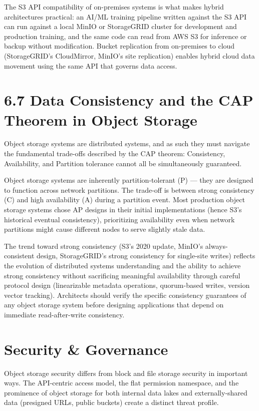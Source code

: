The S3 API compatibility of on-premises systems is what makes hybrid architectures practical: an AI/ML training pipeline written against the S3 API can run against a local MinIO or StorageGRID cluster for development and production training, and the same code can read from AWS S3 for inference or backup without modification. Bucket replication from on-premises to cloud (StorageGRID's CloudMirror, MinIO's site replication) enables hybrid cloud data movement using the same API that governs data access.

\section{6.7 Data Consistency and the CAP Theorem in Object Storage}
Object storage systems are distributed systems, and as such they must navigate the fundamental trade-offs described by the CAP theorem: Consistency, Availability, and Partition tolerance cannot all be simultaneously guaranteed.

Object storage systems are inherently partition-tolerant (P) --- they are designed to function across network partitions. The trade-off is between strong consistency (C) and high availability (A) during a partition event. Most production object storage systems chose AP designs in their initial implementations (hence S3's historical eventual consistency), prioritizing availability even when network partitions might cause different nodes to serve slightly stale data.

The trend toward strong consistency (S3's 2020 update, MinIO's always-consistent design, StorageGRID's strong consistency for single-site writes) reflects the evolution of distributed systems understanding and the ability to achieve strong consistency without sacrificing meaningful availability through careful protocol design (linearizable metadata operations, quorum-based writes, version vector tracking). Architects should verify the specific consistency guarantees of any object storage system before designing applications that depend on immediate read-after-write consistency.

\section{Security \& Governance}
Object storage security differs from block and file storage security in important ways. The API-centric access model, the flat permission namespace, and the prominence of object storage for both internal data lakes and externally-shared data (presigned URLs, public buckets) create a distinct threat profile.

